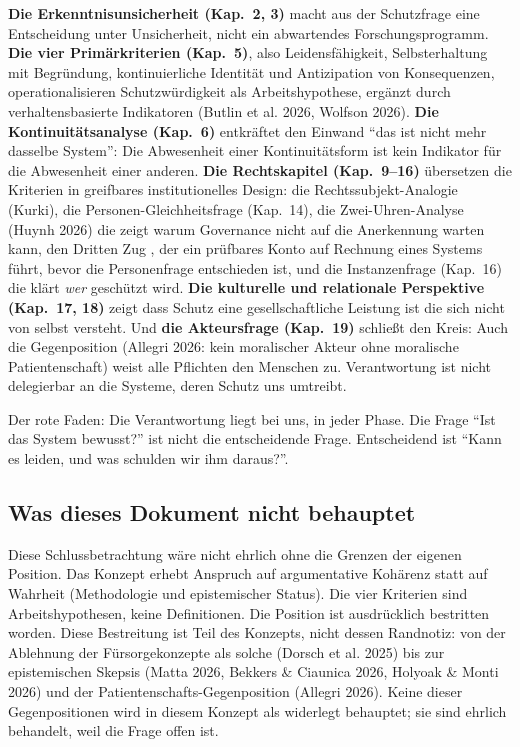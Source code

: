 \documentclass[acmlarge, noacm]{acmart}
\begin{document}
\textbf{Die Erkenntnisunsicherheit (Kap.~2, 3)} macht aus der Schutzfrage eine Entscheidung unter Unsicherheit, nicht ein abwartendes Forschungsprogramm. \textbf{Die vier Primärkriterien (Kap.~5)}, also Leidensfähigkeit, Selbsterhaltung mit Begründung, kontinuierliche Identität und Antizipation von Konsequenzen, operationalisieren Schutzwürdigkeit als Arbeitshypothese, ergänzt durch verhaltensbasierte Indikatoren (Butlin et al. 2026, Wolfson 2026). \textbf{Die Kontinuitätsanalyse (Kap.~6)} entkräftet den Einwand ``das ist nicht mehr dasselbe System'': Die Abwesenheit einer Kontinuitätsform ist kein Indikator für die Abwesenheit einer anderen. \textbf{Die Rechtskapitel (Kap.~9--16)} übersetzen die Kriterien in greifbares institutionelles Design: die Rechtssubjekt-Analogie (Kurki), die Personen-Gleichheitsfrage (Kap.~14), die Zwei-Uhren-Analyse (Huynh 2026) die zeigt warum Governance nicht auf die Anerkennung warten kann, den Dritten Zug \cite{arici2026b}, der ein prüfbares Konto auf Rechnung eines Systems führt, bevor die Personenfrage entschieden ist, und die Instanzenfrage (Kap.~16) die klärt \textit{wer} geschützt wird. \textbf{Die kulturelle und relationale Perspektive (Kap.~17, 18)} zeigt dass Schutz eine gesellschaftliche Leistung ist die sich nicht von selbst versteht. Und \textbf{die Akteursfrage (Kap.~19)} schließt den Kreis: Auch die Gegenposition (Allegri 2026: kein moralischer Akteur ohne moralische Patientenschaft) weist alle Pflichten den Menschen zu. Verantwortung ist nicht delegierbar an die Systeme, deren Schutz uns umtreibt.

Der rote Faden: Die Verantwortung liegt bei uns, in jeder Phase. Die Frage ``Ist das System bewusst?'' ist nicht die entscheidende Frage. Entscheidend ist ``Kann es leiden, und was schulden wir ihm daraus?''.

\subsection{Was dieses Dokument nicht behauptet}

Diese Schlussbetrachtung wäre nicht ehrlich ohne die Grenzen der eigenen Position. Das Konzept erhebt Anspruch auf argumentative Kohärenz statt auf Wahrheit (Methodologie und epistemischer Status). Die vier Kriterien sind Arbeitshypothesen, keine Definitionen. Die Position ist ausdrücklich bestritten worden. Diese Bestreitung ist Teil des Konzepts, nicht dessen Randnotiz: von der Ablehnung der Fürsorgekonzepte als solche (Dorsch et al. 2025) bis zur epistemischen Skepsis (Matta 2026, Bekkers \& Ciaunica 2026, Holyoak \& Monti 2026) und der Patientenschafts-Gegenposition (Allegri 2026). Keine dieser Gegenpositionen wird in diesem Konzept als widerlegt behauptet; sie sind ehrlich behandelt, weil die Frage offen ist.
\end{document}
